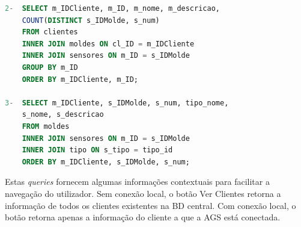 \documentclass[11pt,twoside,a4paper]{report}
\begin{document}
\newpage
\begin{lstlisting}[language = SQL]
2-	SELECT m_IDCliente, m_ID, m_nome, m_descricao,
	COUNT(DISTINCT s_IDMolde, s_num)
	FROM clientes
	INNER JOIN moldes ON cl_ID = m_IDCliente
	INNER JOIN sensores ON m_ID = s_IDMolde
	GROUP BY m_ID
	ORDER BY m_IDCliente, m_ID;
	
3-	SELECT m_IDCliente, s_IDMolde, s_num, tipo_nome,
	s_nome, s_descricao
	FROM moldes
	INNER JOIN sensores ON m_ID = s_IDMolde
	INNER JOIN tipo ON s_tipo = tipo_id
	ORDER BY m_IDCliente, s_IDMolde, s_num;
\end{lstlisting}
Estas \textit{queries} fornecem algumas informações contextuais para facilitar a navegação do utilizador. Sem conexão local, o botão Ver Clientes retorna a informação de todos os clientes existentes na BD central. Com conexão local, o botão retorna apenas a informação do cliente a que a AGS está conectada.
\end{document}
